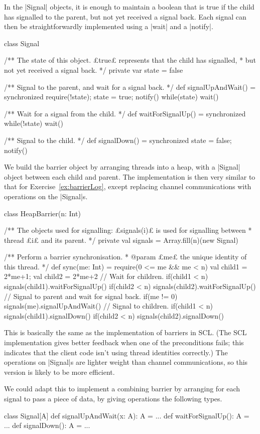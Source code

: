 \begin{answerS}
In the |Signal| objects, it is enough to maintain a boolean that is true if the
child has signalled to the parent, but not yet received a signal back.  Each
signal can then be straightforwardly implemented using a |wait| and a |notify|.
%
\begin{scala}
class Signal{
  /** The state of this object.  £true£ represents that the child has signalled,
    * but not yet received a signal back. */
  private var state = false

  /** Signal to the parent, and wait for a signal back. */
  def signalUpAndWait() = synchronized{
    require(!state); state = true; notify()
    while(state) wait()
  }

  /** Wait for a signal from the child. */
  def waitForSignalUp() = synchronized{ while(!state) wait() }

  /** Signal to the child. */
  def signalDown() = synchronized{ state = false; notify() }
}
\end{scala}

We build the barrier object by arranging threads into a heap, with a |Signal|
object between each child and parent.  The implementation is then very similar
to that for Exercise~\ref{ex:barrierLog}, except replacing channel
communications with operations on the |Signal|s.
%
\begin{scala}
class HeapBarrier(n: Int){
  /** The objects used for signalling: £signals(i)£ is used for signalling between 
    * thread £i£ and its parent. */
  private val signals = Array.fill(n)(new Signal)

  /** Perform a barrier synchronisation.
    * @param £me£ the unique identity of this thread. */
  def sync(me: Int) = {
    require(0 <= me && me < n)
    val child1 = 2*me+1; val child2 = 2*me+2
    // Wait for children.
    if(child1 < n) signals(child1).waitForSignalUp()
    if(child2 < n) signals(child2).waitForSignalUp()
    // Signal to parent and wait for signal back.
    if(me != 0) signals(me).signalUpAndWait()
    // Signal to children.
    if(child1 < n) signals(child1).signalDown()
    if(child2 < n) signals(child2).signalDown()
  }
}
\end{scala}

This is basically the same as the implementation of barriers in SCL.  (The SCL
implementation gives better feedback when one of the preconditions fails; this
indicates that the client code isn't using thread identities correctly.)  The
operations on |Signal|s are lighter weight than channel communications, so
this version is likely to be more efficient. 

We could adapt this to implement a combining barrier by arranging for each
signal to pass a piece of data, by giving operations the following types.
%
\begin{scala}
class Signal[A]{
  def signalUpAndWait(x: A): A = ...
  def waitForSignalUp(): A = ...
  def signalDown(): A = ...
} 
\end{scala}
\end{answerS}
